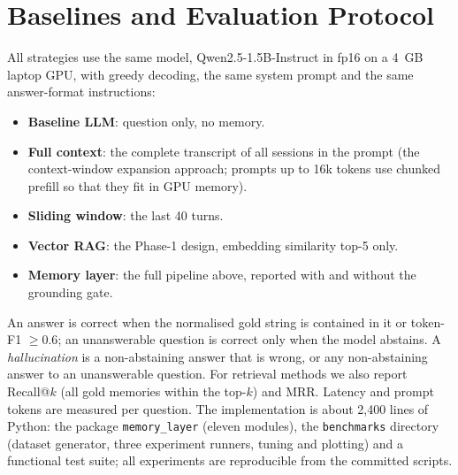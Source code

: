 \section{Baselines and Evaluation Protocol}
All strategies use the same model, Qwen2.5-1.5B-Instruct \cite{qwen25} in fp16 on a 4~GB laptop GPU, with
greedy decoding, the same system prompt and the same answer-format instructions:
\begin{itemize}[nosep]
  \item \textbf{Baseline LLM}: question only, no memory.
  \item \textbf{Full context}: the complete transcript of all sessions in the prompt (the context-window
        expansion approach; prompts up to 16k tokens use chunked prefill so that they fit in GPU memory).
  \item \textbf{Sliding window}: the last 40 turns.
  \item \textbf{Vector RAG}: the Phase-1 design, embedding similarity top-5 only.
  \item \textbf{Memory layer}: the full pipeline above, reported with and without the grounding gate.
\end{itemize}
An answer is correct when the normalised gold string is contained in it or token-F1 $\ge 0.6$; an
unanswerable question is correct only when the model abstains. A \emph{hallucination} is a non-abstaining
answer that is wrong, or any non-abstaining answer to an unanswerable question. For retrieval methods we also
report Recall@$k$ (all gold memories within the top-$k$) and MRR. Latency and prompt tokens are measured per
question. The implementation is about 2,400 lines of Python: the package \texttt{memory\_layer} (eleven modules),
the \texttt{benchmarks} directory (dataset generator, three experiment runners, tuning and plotting) and a
functional test suite; all experiments are reproducible from the committed scripts.
